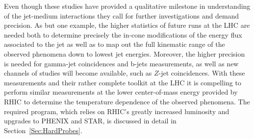   Even though these studies have provided a qualitative milestone in understanding of the jet-medium interactions they call for further investigations and demand precision. As but one example, the higher statistics of future runs at the LHC are needed both to determine precisely the in-cone modifications of the energy flux associated to the jet as well as to map out the full kinematic range of the observed phenomena down to lowest jet energies. Moreover, the higher precision is needed for gamma-jet coincidences and b-jets measurements, as well as new channels of studies will become available, such as $Z$-jet coincidences.
With these measurements and their rather complete toolkit at the LHC it is compelling to perform similar measurements at the lower center-of-mass energy provided by RHIC to determine the temperature dependence of the observed phenomena. The required program, which relies on RHIC's greatly increased luminosity and upgrades to PHENIX and STAR, is discussed in detail in Section~\ref{Sec:HardProbes}. 

